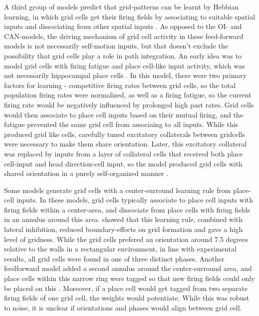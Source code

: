 \documentclass{article}
\begin{document}
    A third group of models predict that grid-patterns can be learnt by Hebbian learning, in which grid cells get their firing fields by associating to suitable spatial inputs and dissociating from other spatial inputs \parencite{Soldatkina2021}. As opposed to the OI- and CAN-models, the driving mechanism of grid cell activity in these feed-forward models is not necessarily self-motion inputs, but that doesn't exclude the possibility that grid cells play a role in path integration. An early idea was to model grid cells with firing fatigue and place cell-like input activity, which was not necessarily hippocampal place cells \parencite{Kropff2008}. In this model, there were two primary factors for learning - competitive firing rates between grid cells, so the total population firing rates were normalized, as well as a firing fatigue, so the current firing rate would be negatively influenced by prolonged high past rates. Grid cells would then associate to place cell inputs based on their mutual firing, and the fatigue prevented the same grid cell from associaing to all inputs. While this produced grid like cells, carefully tuned excitatory collaterals between gridcells were necessary to make them share orientation.
    Later, this excitatory collateral was replaced by inputs from a layer of collateral cells that received both place cell-input and head direction-cell input, so the model produced grid cells with shared orientation in a purely self-organized manner \parencite{Si2013}.

    Some models generate grid cells with a center-surround learning rule from place-cell inputs. In these models, grid cells typically associate to place cell inputs with firing fields within a center-area, and dissociate from place cells with firing fields in an annulus around this area. \cite{Mercado2020} showed that this learning rule, combined with lateral inhibition, reduced boundary-effects on grid formation and gave a high level of gridness. While the grid cells prefered an orientation around 7.5 degrees relative to the walls in a rectangular environment, in line with experimental results, all grid cells were found in one of three distinct phases. Another feedforward model added a second annulus around the center-surround area, and place cells within this narrow ring were tagged so that new firing fields could only be placed on this \parencite{Castro2014}. Moreover, if a place cell would get tagged from two separate firing fields of one grid cell, the weights would potentiate. While this was robust to noise, it is unclear if orientations and phases would align between grid cell.
\end{document}
